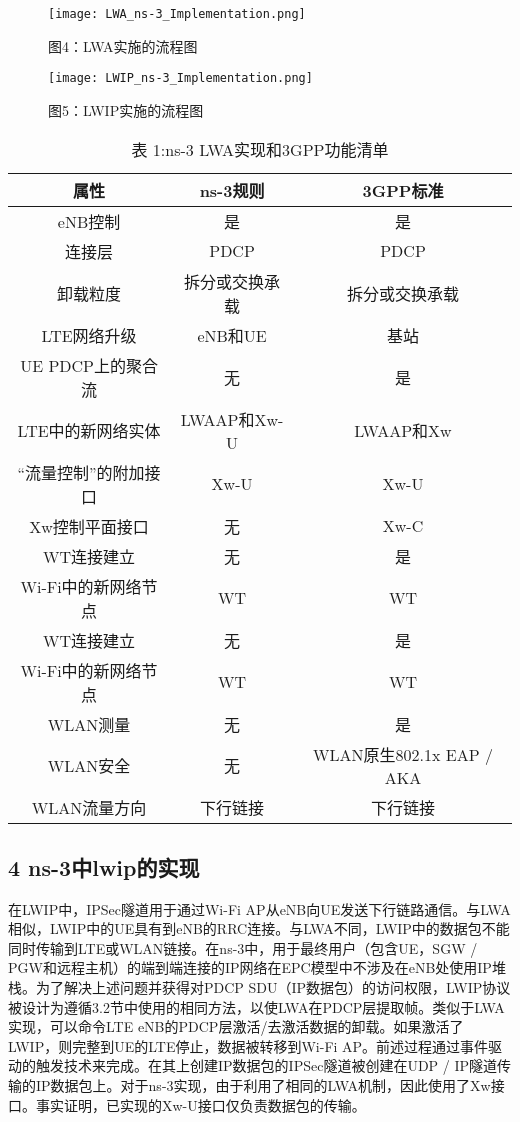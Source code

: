 \begin{figure}[htb]
  \centering
  \texttt{[image: LWA\_ns-3\_Implementation.png]}
  \caption*{图4：LWA实施的流程图}
\end{figure}


\begin{figure}[htb]
  \centering
  \texttt{[image: LWIP\_ns-3\_Implementation.png]}
  \caption{图5：LWIP实施的流程图}
\end{figure}

\begin{table}
  \centering
  \caption*{表 1:ns-3 LWA实现和3GPP功能清单}
  \begin{tabular}{|c|c|c|}   %
   \hline         %
    属性 & ns-3规则 & 3GPP标准 \\
    \hline 
    eNB控制  & 是  & 是 \\
    \hline 
    连接层  & PDCP  & PDCP \\
    \hline 
    卸载粒度  & 拆分或交换承载  & 拆分或交换承载 \\
    \hline 
    LTE网络升级  & eNB和UE  & 基站 \\
    \hline 
    UE PDCP上的聚合流  &  无 & 是 \\
    \hline 
    LTE中的新网络实体 & LWAAP和Xw-U & LWAAP和Xw \\
    \hline 
    “流量控制”的附加接口  & Xw-U & Xw-U \\
    \hline 
    Xw控制平面接口  & 无 & Xw-C \\
    \hline 
    WT连接建立 & 无 & 是 \\
    \hline 
    Wi-Fi中的新网络节点  & WT & WT \\
    \hline 
    WT连接建立  & 无 & 是 \\
    \hline 
    Wi-Fi中的新网络节点  & WT & WT \\
    \hline 
    WLAN测量 & 无 & 是 \\
    \hline 
    WLAN安全 & 无 & WLAN原生802.1x EAP / AKA \\
    \hline 
    WLAN流量方向 & 下行链接 & 下行链接 \\
    \hline 
\end{tabular}
\end{table}


\newpage
\subsection*{4 ns-3中lwip的实现}
在LWIP中，IPSec隧道用于通过Wi-Fi AP从eNB向UE发送下行链路通信。与LWA相似，LWIP中的UE具有到eNB的RRC连接。与LWA不同，LWIP中的数据包不能同时传输到LTE或WLAN链接。在ns-3中，用于最终用户（包含UE，SGW / PGW和远程主机）的端到端连接的IP网络在EPC模型中不涉及在eNB处使用IP堆栈。为了解决上述问题并获得对PDCP SDU（IP数据包）的访问权限，LWIP协议被设计为遵循3.2节中使用的相同方法，以使LWA在PDCP层提取帧。类似于LWA实现，可以命令LTE eNB的PDCP层激活/去激活数据的卸载。如果激活了LWIP，则完整到UE的LTE停止，数据被转移到Wi-Fi AP。前述过程通过事件驱动的触发技术来完成。在其上创建IP数据包的IPSec隧道被创建在UDP / IP隧道传输的IP数据包上。对于ns-3实现，由于利用了相同的LWA机制，因此使用了Xw接口。事实证明，已实现的Xw-U接口仅负责数据包的传输。


